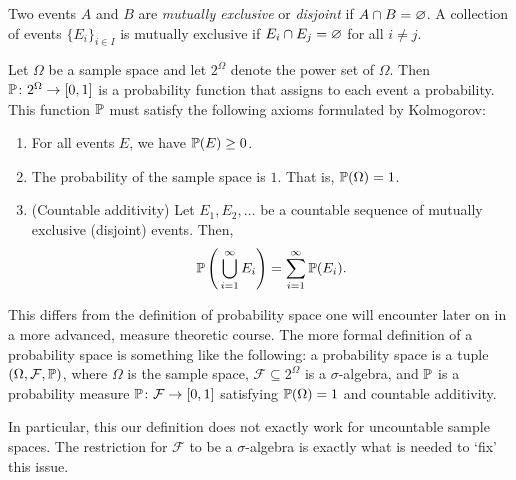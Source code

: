 
\begin{definition}
  Two events $A$ and $B$ are \emph{mutually exclusive} or \emph{disjoint} if $A \cap B = \varnothing$. A collection of events $\{E_i\}_{i \in I}$ is mutually exclusive if $E_i \cap E_j = \varnothing$ for all $i \neq j$.
\end{definition}

\begin{definition}
  Let $\Omega$ be a sample space and let $2^{\Omega}$ denote the power set of $\Omega$. Then  $\operatorname{\mathbb{P}} \colon 2^{\Omega} \to [0, 1]$ is a probability function that assigns to each event a probability. This function $\operatorname{\mathbb{P}}$ must satisfy the following axioms formulated by Kolmogorov:
  \begin{enumerate}
    \item For all events $E$, we have $\operatorname{\mathbb{P}}(E) \ge 0$.
    \item The probability of the sample space is $1$. That is, $\operatorname{\mathbb{P}}(\Omega) = 1$.
    \item (Countable additivity) Let $E_1, E_2, \dots$ be a countable sequence of mutually exclusive (disjoint) events. Then, \[
    \operatorname{\mathbb{P}}\left(\, \bigcup_{i = 1}^{\infty} E_i \right) = \sum_{i = 1}^{\infty} \operatorname{\mathbb{P}}(E_i).
    \] 
  \end{enumerate}
\end{definition}

\begin{remark}
  This differs from the definition of probability space one will encounter later on in a more advanced, measure theoretic course. The more formal definition of a probability space is something like the following: a probability space is a tuple $(\Omega, \mathcal{F}, \operatorname{\mathbb{P}})$, where $\Omega$ is the sample space, $\mathcal{F} \subseteq 2^{\Omega}$ is a $\sigma$-algebra, and $\operatorname{\mathbb{P}}$ is a probability measure $\operatorname{\mathbb{P}} \colon \mathcal{F} \to [0, 1]$ satisfying $\operatorname{\mathbb{P}}(\Omega) = 1$ and countable additivity.

  In particular, this our definition does not exactly work for uncountable sample spaces. The restriction for $\mathcal{F}$ to be a $\sigma$-algebra is exactly what is needed to `fix' this issue.
\end{remark}

